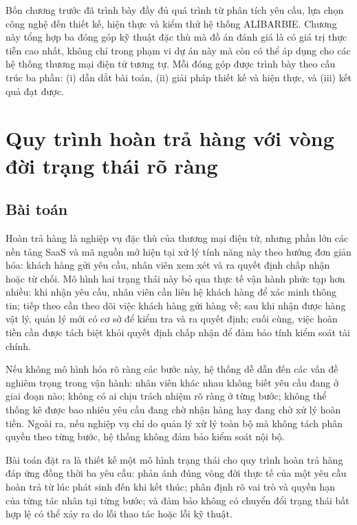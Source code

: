 \documentclass[../DoAn.tex]{subfiles}
\begin{document}
Bốn chương trước đã trình bày đầy đủ quá trình từ phân tích yêu cầu, lựa chọn
công nghệ đến thiết kế, hiện thực và kiểm thử hệ thống ALIBARBIE. Chương này
tổng hợp ba đóng góp kỹ thuật đặc thù mà đồ án đánh giá là có giá trị thực tiễn
cao nhất, không chỉ trong phạm vi dự án này mà còn có thể áp dụng cho các hệ
thống thương mại điện tử tương tự. Mỗi đóng góp được trình bày theo cấu trúc
ba phần: (i) dẫn dắt bài toán, (ii) giải pháp thiết kế và hiện thực, và (iii)
kết quả đạt được.

\section{Quy trình hoàn trả hàng với vòng đời trạng thái rõ ràng}
\label{section:5.1}

\subsection{Bài toán}
\label{subsection:5.1.1}

Hoàn trả hàng là nghiệp vụ đặc thù của thương mại điện tử, nhưng phần lớn
các nền tảng SaaS và mã nguồn mở hiện tại xử lý tính năng này theo hướng đơn
giản hóa: khách hàng gửi yêu cầu, nhân viên xem xét và ra quyết định chấp
nhận hoặc từ chối. Mô hình hai trạng thái này bỏ qua thực tế vận hành phức
tạp hơn nhiều: khi nhận yêu cầu, nhân viên cần liên hệ khách hàng để xác minh
thông tin; tiếp theo cần theo dõi việc khách hàng gửi hàng về; sau khi nhận
được hàng vật lý, quản lý mới có cơ sở để kiểm tra và ra quyết định; cuối
cùng, việc hoàn tiền cần được tách biệt khỏi quyết định chấp nhận để đảm bảo
tính kiểm soát tài chính.

Nếu không mô hình hóa rõ ràng các bước này, hệ thống dễ dẫn đến các vấn đề
nghiêm trọng trong vận hành: nhân viên khác nhau không biết yêu cầu đang ở
giai đoạn nào; không có ai chịu trách nhiệm rõ ràng ở từng bước; không thể
thống kê được bao nhiêu yêu cầu đang chờ nhận hàng hay đang chờ xử lý hoàn
tiền. Ngoài ra, nếu nghiệp vụ chỉ do quản lý xử
lý toàn bộ mà không tách phân quyền theo từng bước, hệ thống không đảm bảo
kiểm soát nội bộ.

Bài toán đặt ra là thiết kế một mô hình trạng thái cho quy trình hoàn trả hàng
đáp ứng đồng thời ba yêu cầu: phản ánh đúng vòng đời thực tế của một yêu cầu
hoàn trả từ lúc phát sinh đến khi kết thúc; phân định rõ vai trò và quyền hạn
của từng tác nhân tại từng bước; và đảm bảo không có chuyển đổi trạng thái bất
hợp lệ có thể xảy ra do lỗi thao tác hoặc lỗi kỹ thuật.
\end{document}
